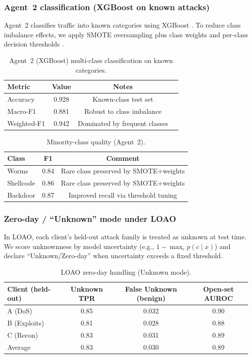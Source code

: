 \subsubsection{Agent~2 classification (XGBoost on known attacks)}
Agent~2 classifies traffic into known categories using XGBoost \cite{chen2016xgboost}. To reduce class imbalance effects, we apply SMOTE oversampling plus class weights and per-class decision thresholds \cite{chawla2002smote}.

\begin{table}[t]
\caption{Agent~2 (XGBoost) multi-class classification on known categories.}
\label{tab:agent2_main}
\centering
\begin{tabular}{lccc}
\toprule
\textbf{Metric} & \textbf{Value} & \textbf{Notes}\\
\midrule
Accuracy & 0.928 & Known-class test set\\
Macro-F1 & 0.881 & Robust to class imbalance\\
Weighted-F1 & 0.942 & Dominated by frequent classes\\
\bottomrule
\end{tabular}
\end{table}

\begin{table}[t]
\caption{Minority-class quality (Agent~2).}
\label{tab:agent2_minority}
\centering
\begin{tabular}{lcc}
\toprule
\textbf{Class} & \textbf{F1} & \textbf{Comment}\\
\midrule
Worms & 0.84 & Rare class preserved by SMOTE+weights\\
Shellcode & 0.86 & Rare class preserved by SMOTE+weights\\
Backdoor & 0.87 & Improved recall via threshold tuning\\
\bottomrule
\end{tabular}
\end{table}

\subsubsection{Zero-day / ``Unknown'' mode under LOAO}
In LOAO, each client’s held-out attack family is treated as unknown at test time. We score unknownness by model uncertainty (e.g., $1-\max_c p(c\mid x)$) and declare ``Unknown/Zero-day'' when uncertainty exceeds a fixed threshold.

\begin{table}[t]
\caption{LOAO zero-day handling (Unknown mode).}
\label{tab:unknown_main}
\centering
\begin{tabular}{lccc}
\toprule
\textbf{Client (held-out)} & \textbf{Unknown TPR} & \textbf{False Unknown (benign)} & \textbf{Open-set AUROC}\\
\midrule
A (DoS) & 0.85 & 0.032 & 0.90\\
B (Exploits) & 0.81 & 0.028 & 0.88\\
C (Recon) & 0.83 & 0.031 & 0.89\\
\midrule
Average & 0.83 & 0.030 & 0.89\\
\bottomrule
\end{tabular}
\end{table}

